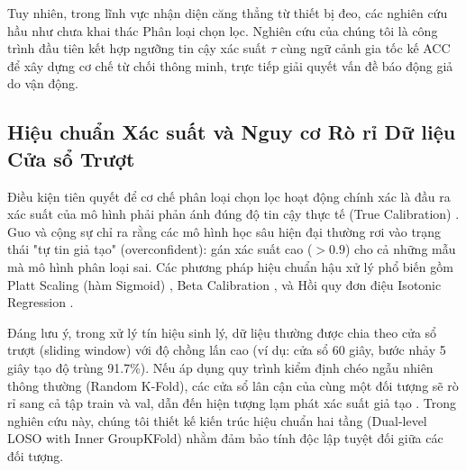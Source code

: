 \documentclass[conference]{IEEEtran}
\begin{document}
Tuy nhiên, trong lĩnh vực nhận diện căng thẳng từ thiết bị đeo, các nghiên cứu hầu như chưa khai thác Phân loại chọn lọc. Nghiên cứu của chúng tôi là công trình đầu tiên kết hợp ngưỡng tin cậy xác suất $\tau$ cùng ngữ cảnh gia tốc kế ACC để xây dựng cơ chế từ chối thông minh, trực tiếp giải quyết vấn đề báo động giả do vận động.

\subsection{Hiệu chuẩn Xác suất và Nguy cơ Rò rỉ Dữ liệu Cửa sổ Trượt}
Điều kiện tiên quyết để cơ chế phân loại chọn lọc hoạt động chính xác là đầu ra xác suất của mô hình phải phản ánh đúng độ tin cậy thực tế (True Calibration) \cite{guo2017calibration}. Guo và cộng sự \cite{guo2017calibration} chỉ ra rằng các mô hình học sâu hiện đại thường rơi vào trạng thái "tự tin giả tạo" (overconfident): gán xác suất cao ($>0.9$) cho cả những mẫu mà mô hình phân loại sai. Các phương pháp hiệu chuẩn hậu xử lý phổ biến gồm Platt Scaling (hàm Sigmoid) \cite{platt1999probabilistic}, Beta Calibration \cite{kull2017beta}, và Hồi quy đơn điệu Isotonic Regression \cite{niculescu2005predicting, zadrozny2002transforming}.

Đáng lưu ý, trong xử lý tín hiệu sinh lý, dữ liệu thường được chia theo cửa sổ trượt (sliding window) với độ chồng lấn cao (ví dụ: cửa sổ 60 giây, bước nhảy 5 giây tạo độ trùng 91.7\%). Nếu áp dụng quy trình kiểm định chéo ngẫu nhiên thông thường (Random K-Fold), các cửa sổ lân cận của cùng một đối tượng sẽ rò rỉ sang cả tập train và val, dẫn đến hiện tượng lạm phát xác suất giả tạo \cite{saeb2017need, little2019using}. Trong nghiên cứu này, chúng tôi thiết kế kiến trúc hiệu chuẩn hai tầng (Dual-level LOSO with Inner GroupKFold) nhằm đảm bảo tính độc lập tuyệt đối giữa các đối tượng.
\end{document}
